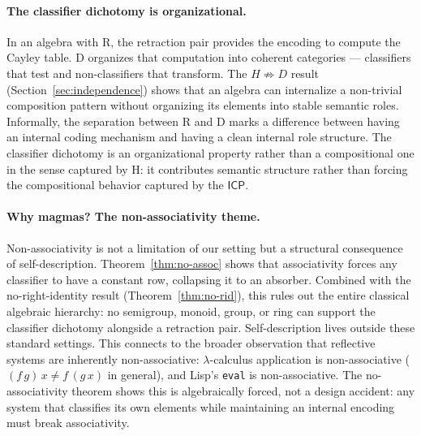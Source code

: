 \documentclass[a4paper,UKenglish,cleveref,autoref,thm-restate]{lipics-v2021}
\newcommand{\ICP}{\textsf{ICP}}
\begin{document}
\paragraph{The classifier dichotomy is organizational.}
In an algebra with R, the retraction pair provides the encoding to compute the Cayley table. D organizes that computation into coherent categories --- classifiers that test and non-classifiers that transform. The $H \not\Rightarrow D$ result (Section~\ref{sec:independence}) shows that an algebra can internalize a non-trivial composition pattern without organizing its elements into stable semantic roles. Informally, the separation between R and D marks a difference between having an internal coding mechanism and having a clean internal role structure. The classifier dichotomy is an organizational property rather than a compositional one in the sense captured by H: it contributes semantic structure rather than forcing the compositional behavior captured by the $\ICP$.

\paragraph{Why magmas? The non-associativity theme.}
Non-associativity is not a limitation of our setting but a structural consequence of self-description. Theorem~\ref{thm:no-assoc} shows that associativity forces any classifier to have a constant row, collapsing it to an absorber. Combined with the no-right-identity result (Theorem~\ref{thm:no-rid}), this rules out the entire classical algebraic hierarchy: no semigroup, monoid, group, or ring can support the classifier dichotomy alongside a retraction pair. Self-description lives outside these standard settings. This connects to the broader observation that reflective systems are inherently non-associative: $\lambda$-calculus application is non-associative ($(f\,g)\,x \neq f\,(g\,x)$ in general), and Lisp's \texttt{eval} is non-associative. The no-associativity theorem shows this is algebraically forced, not a design accident: any system that classifies its own elements while maintaining an internal encoding must break associativity.
\end{document}
